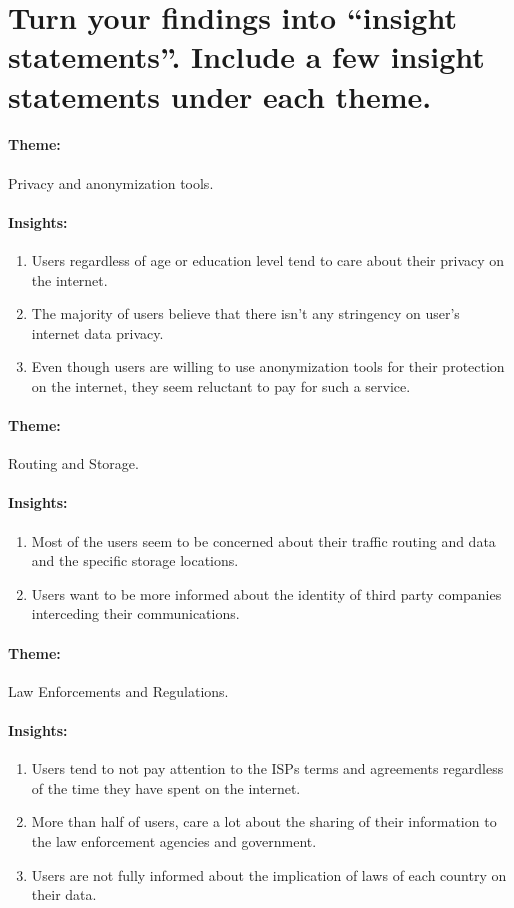 \section{Turn your findings into ``insight statements''. Include a few insight 
statements under each theme.} 
\label{section_3}

\vspace{0.4cm}
\paragraph{Theme:} Privacy and anonymization tools.
\paragraph{Insights:}
\begin{enumerate}
\item
Users regardless of age or education level tend to care about their privacy on 
the internet.
\item
The majority of users believe that there isn't any stringency on user's internet 
data privacy.
\item
Even though users are willing to use anonymization tools for their protection on 
the internet, they seem reluctant to pay for such a service.
\end{enumerate}

\vspace{0.1cm}
\paragraph{Theme:} Routing and Storage. 
\paragraph{Insights:}
\begin{enumerate}
\item
Most of the users seem to be concerned about their traffic routing and data and 
the specific storage locations.
\item
Users want to be more informed about the identity of third party companies 
interceding their communications.
\end{enumerate}

\vspace{0.1cm}
\paragraph{Theme:} Law Enforcements and Regulations.
\paragraph{Insights:}
\begin{enumerate}
\item
Users tend to not pay attention to the ISPs terms and agreements regardless of 
the time they have spent on the internet. 
\item
More than half of users, care a lot about the sharing of their information to 
the law enforcement agencies and government.
\item
Users are not fully informed about the implication of laws of each country on 
their data.
\end{enumerate}

